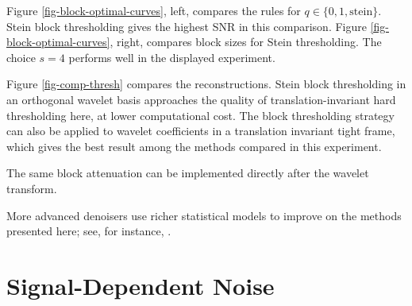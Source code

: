 Figure \ref{fig-block-optimal-curves}, left, compares the rules for $q \in \{0,1,\text{stein}\}$. Stein block thresholding gives the highest SNR in this comparison.
Figure \ref{fig-block-optimal-curves}, right, compares block sizes for Stein thresholding. The choice $s=4$ performs well in the displayed experiment.


Figure \ref{fig-comp-thresh} compares the reconstructions. Stein block thresholding in an orthogonal wavelet basis approaches the quality of translation-invariant hard thresholding here, at lower computational cost.
The block thresholding strategy can also be applied to wavelet coefficients in a translation invariant tight frame, which gives the best result among the methods compared in this experiment.

The same block attenuation can be implemented directly after the wavelet transform.


More advanced denoisers use richer statistical models to improve on the methods presented here; see, for instance, \cite{portilla-denoise}.


                                  
                                                                                                                                                                                                                


                                                     
                                                     
                                                     
\section{Signal-Dependent Noise}
\label{sect-data-dept-noises}

